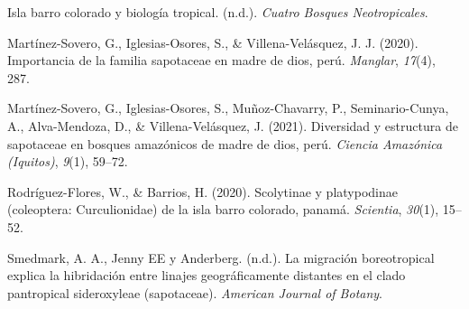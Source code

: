 \documentclass[11pt,]{article}
\begin{document}
\hypertarget{ref-leigh1990barro}{}
Isla barro colorado y biología tropical. (n.d.). \emph{Cuatro Bosques
Neotropicales}.

\hypertarget{ref-martinez2020importancia}{}
Martínez-Sovero, G., Iglesias-Osores, S., \& Villena-Velásquez, J. J.
(2020). Importancia de la familia sapotaceae en madre de dios, perú.
\emph{Manglar}, \emph{17}(4), 287.

\hypertarget{ref-martinez2021diversidad}{}
Martínez-Sovero, G., Iglesias-Osores, S., Muñoz-Chavarry, P.,
Seminario-Cunya, A., Alva-Mendoza, D., \& Villena-Velásquez, J. (2021).
Diversidad y estructura de sapotaceae en bosques amazónicos de madre de
dios, perú. \emph{Ciencia Amazónica (Iquitos)}, \emph{9}(1), 59--72.

\hypertarget{ref-rodriguez2020scolytinae}{}
Rodríguez-Flores, W., \& Barrios, H. (2020). Scolytinae y platypodinae
(coleoptera: Curculionidae) de la isla barro colorado, panamá.
\emph{Scientia}, \emph{30}(1), 15--52.

\hypertarget{ref-smedmark2007boreotropical}{}
Smedmark, A. A., Jenny EE y Anderberg. (n.d.). La migración
boreotropical explica la hibridación entre linajes geográficamente
distantes en el clado pantropical sideroxyleae (sapotaceae).
\emph{American Journal of Botany}.




\newpage
\singlespacing 
\end{document}
